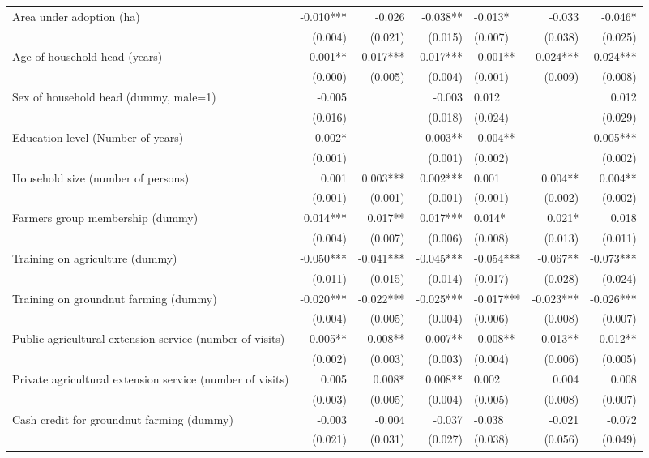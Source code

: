 \documentclass[
]{article}
\begin{document}
\begin{landscape}
\begin{longtable}[t]{lrrrlrr}
\endfoot
\bottomrule
\endlastfoot
Area under adoption (ha) & -0.010*** & -0.026 & -0.038** & -0.013* & -0.033 & -0.046*\\
 & (0.004) & (0.021) & (0.015) & (0.007) & (0.038) & (0.025)\\
Age of household head (years) & -0.001** & -0.017*** & -0.017*** & -0.001** & -0.024*** & -0.024***\\
 & (0.000) & (0.005) & (0.004) & (0.001) & (0.009) & (0.008)\\
Sex of household head (dummy, male=1) & -0.005 &  & -0.003 & 0.012 &  & 0.012\\
 & (0.016) &  & (0.018) & (0.024) &  & (0.029)\\
Education level (Number of years) & -0.002* &  & -0.003** & -0.004** &  & -0.005***\\
 & (0.001) &  & (0.001) & (0.002) &  & (0.002)\\
Household size (number of persons) & 0.001 & 0.003*** & 0.002*** & 0.001 & 0.004** & 0.004**\\
 & (0.001) & (0.001) & (0.001) & (0.001) & (0.002) & (0.002)\\
Farmers group membership (dummy) & 0.014*** & 0.017** & 0.017*** & 0.014* & 0.021* & 0.018\\
 & (0.004) & (0.007) & (0.006) & (0.008) & (0.013) & (0.011)\\
Training on agriculture (dummy) & -0.050*** & -0.041*** & -0.045*** & -0.054*** & -0.067** & -0.073***\\
 & (0.011) & (0.015) & (0.014) & (0.017) & (0.028) & (0.024)\\
Training on groundnut farming (dummy) & -0.020*** & -0.022*** & -0.025*** & -0.017*** & -0.023*** & -0.026***\\
 & (0.004) & (0.005) & (0.004) & (0.006) & (0.008) & (0.007)\\
Public agricultural extension service (number of visits) & -0.005** & -0.008** & -0.007** & -0.008** & -0.013** & -0.012**\\
 & (0.002) & (0.003) & (0.003) & (0.004) & (0.006) & (0.005)\\
Private agricultural extension service (number of visits) & 0.005 & 0.008* & 0.008** & 0.002 & 0.004 & 0.008\\
 & (0.003) & (0.005) & (0.004) & (0.005) & (0.008) & (0.007)\\
Cash credit for groundnut farming (dummy) & -0.003 & -0.004 & -0.037 & -0.038 & -0.021 & -0.072\\
 & (0.021) & (0.031) & (0.027) & (0.038) & (0.056) & (0.049)\\

\end{longtable}
\end{landscape}
\end{document}
